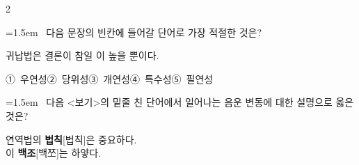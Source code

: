 \documentclass[10pt, a4paper]{article}
\begin{document}
\begin{multicols}{2}
\noindent\begin{minipage}{\columnwidth}
\vspace{2mm}
{\hangindent=1.5em  ~다음 문장의 빈칸에 들어갈 단어로 가장 적절한 것은?\par}

\vspace{1mm}
\begin{boxibox}
귀납법은 결론이 참일 \underline{\hspace{3cm}}이 높을 뿐이다. \\
\end{boxibox}
\vspace{1mm}

\vspace{0.5mm}
\noindent
\mbox{①~우연성}\hspace{1em}\mbox{②~당위성}\hspace{1em}\mbox{③~개연성}\hspace{1em}\mbox{④~특수성}\hspace{1em}\mbox{⑤~필연성}

\vspace{4mm}
\end{minipage}
\par

\noindent\begin{minipage}{\columnwidth}
\vspace{2mm}
{\hangindent=1.5em  ~다음 <보기>의 밑줄 친 단어에서 일어나는 음운 변동에 대한 설명으로 옳은 것은?\par}

\vspace{1mm}
\begin{boxibox}
연역법의 \textbf{법칙}[법칙]은 중요하다. \\
이 \textbf{백조}[백쪼]는 하얗다. \\
\end{boxibox}
\vspace{1mm}


\end{minipage}
\end{multicols}
\end{document}

